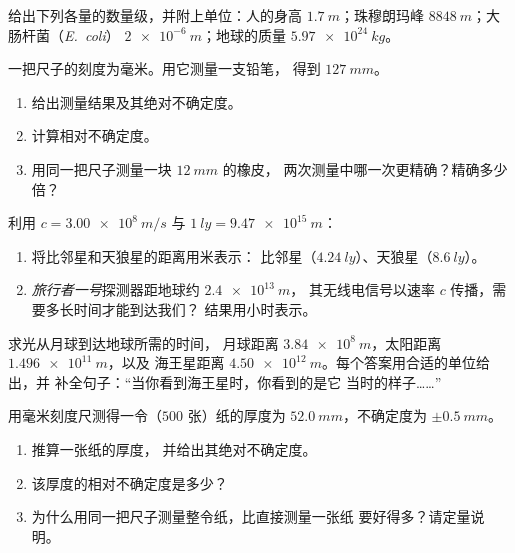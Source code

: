 \begin{exercise}[$\star$]\label{exo:g10:orders-of-magnitude:4}
给出下列各量的数量级，并附上单位：人的身高
$\qty{1.7}{m}$；珠穆朗玛峰 $\qty{8848}{m}$；大肠杆菌（\emph{E.~coli}）
$\qty{2e-6}{m}$；地球的质量
$\qty{5.97e24}{kg}$。
\end{exercise}

\begin{exercise}[$\star$]\label{exo:g10:orders-of-magnitude:5}
一把尺子的刻度为毫米。用它测量一支铅笔，
得到 $\qty{127}{mm}$。
\begin{enumerate}
  \item 给出测量结果及其绝对不确定度。
  \item 计算相对不确定度。
  \item 用同一把尺子测量一块 $\qty{12}{mm}$ 的橡皮，
        两次测量中哪一次更精确？精确多少倍？
\end{enumerate}
\end{exercise}

\begin{exercise}[$\star\star$]\label{exo:g10:orders-of-magnitude:6}
利用 $c = \qty{3.00e8}{m/s}$ 与 $\qty{1}{ly} = \qty{9.47e15}{m}$：
\begin{enumerate}
  \item 将比邻星和天狼星的距离用米表示：
        比邻星（$\qty{4.24}{ly}$）、天狼星（$\qty{8.6}{ly}$）。
  \item \emph{旅行者一号}探测器距地球约 $\qty{2.4e13}{m}$，
        其无线电信号以速率 $c$ 传播，需要多长时间才能到达我们？
        结果用小时表示。
\end{enumerate}
\end{exercise}

\begin{exercise}[$\star\star$]\label{exo:g10:orders-of-magnitude:7}
求光从月球到达地球所需的时间，
月球距离 $\qty{3.84e8}{m}$，太阳距离 $\qty{1.496e11}{m}$，以及
海王星距离 $\qty{4.50e12}{m}$。每个答案用合适的单位给出，并
补全句子：“当你看到海王星时，你看到的是它
当时的样子……”
\end{exercise}

\begin{exercise}[$\star\star$]\label{exo:g10:orders-of-magnitude:8}
用毫米刻度尺测得一令（$500$ 张）纸的厚度为
$\qty{52.0}{mm}$，不确定度为 $\pm\qty{0.5}{mm}$。
\begin{enumerate}
  \item 推算一张纸的厚度，
        并给出其绝对不确定度。
  \item 该厚度的相对不确定度是多少？
  \item 为什么用同一把尺子测量整令纸，比直接测量一张纸
        要好得多？请定量说明。
\end{enumerate}
\end{exercise}

